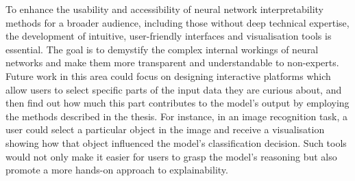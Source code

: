 To enhance the usability and accessibility of neural network interpretability methods for a broader audience, including those without deep technical expertise, the development of intuitive, user-friendly interfaces and visualisation tools is essential. The goal is to demystify the complex internal workings of neural networks and make them more transparent and understandable to non-experts. Future work in this area could focus on designing interactive platforms which allow users to select specific parts of the input data they are curious about, and then find out how much this part contributes to the model's output by employing the methods described in the thesis. For instance, in an image recognition task, a user could select a particular object in the image and receive a visualisation showing how that object influenced the model's classification decision. Such tools would not only make it easier for users to grasp the model's reasoning but also promote a more hands-on approach to explainability.



